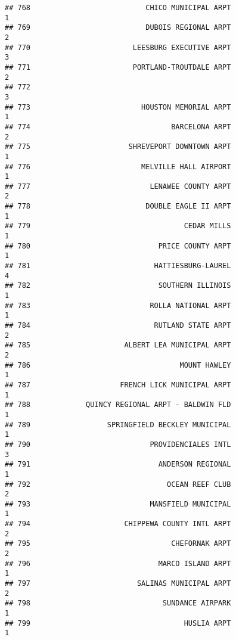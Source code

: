 \documentclass[
]{article}
\begin{document}
\begin{verbatim}
## 768                           CHICO MUNICIPAL ARPT                           1
## 769                           DUBOIS REGIONAL ARPT                           2
## 770                        LEESBURG EXECUTIVE ARPT                           3
## 771                        PORTLAND-TROUTDALE ARPT                           2
## 772                                                                          3
## 773                          HOUSTON MEMORIAL ARPT                           1
## 774                                 BARCELONA ARPT                           2
## 775                       SHREVEPORT DOWNTOWN ARPT                           1
## 776                          MELVILLE HALL AIRPORT                           1
## 777                            LENAWEE COUNTY ARPT                           2
## 778                           DOUBLE EAGLE II ARPT                           1
## 779                                    CEDAR MILLS                           1
## 780                              PRICE COUNTY ARPT                           1
## 781                             HATTIESBURG-LAUREL                           4
## 782                              SOUTHERN ILLINOIS                           1
## 783                            ROLLA NATIONAL ARPT                           1
## 784                             RUTLAND STATE ARPT                           2
## 785                      ALBERT LEA MUNICIPAL ARPT                           2
## 786                                   MOUNT HAWLEY                           1
## 787                     FRENCH LICK MUNICIPAL ARPT                           1
## 788             QUINCY REGIONAL ARPT - BALDWIN FLD                           1
## 789                  SPRINGFIELD BECKLEY MUNICIPAL                           1
## 790                            PROVIDENCIALES INTL                           3
## 791                              ANDERSON REGIONAL                           1
## 792                                OCEAN REEF CLUB                           2
## 793                            MANSFIELD MUNICIPAL                           1
## 794                      CHIPPEWA COUNTY INTL ARPT                           2
## 795                                 CHEFORNAK ARPT                           2
## 796                              MARCO ISLAND ARPT                           1
## 797                         SALINAS MUNICIPAL ARPT                           2
## 798                               SUNDANCE AIRPARK                           1
## 799                                    HUSLIA ARPT                           1

\end{verbatim}
\end{document}
